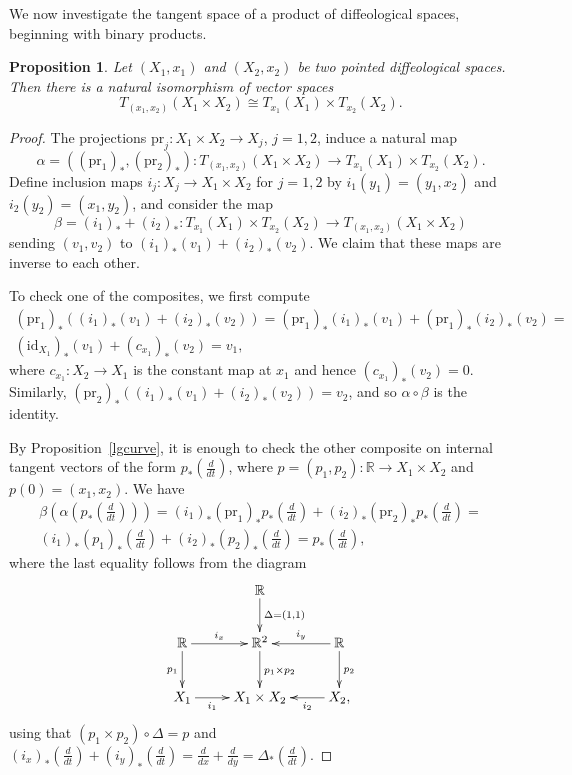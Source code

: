 \documentclass[12pt]{amsart}
\newtheorem{prop}[de]{Proposition}
\theoremstyle{remark}
\newcommand{\ra}{\to}
\newcommand{\ddt}{{\textstyle\frac{d}{dt}}}
\newcommand{\pr}{{\mathrm{pr}}}
\newcommand{\id}{{\mathrm{id}}}
\def \R{\mathbb{R}}
\begin{document}
We now investigate the tangent space of a product of diffeological spaces,
beginning with binary products.

\begin{prop}\label{product}
Let $(X_1,x_1)$ and $(X_2,x_2)$ be two pointed diffeological spaces.
Then there is a natural isomorphism of vector spaces
\[
T_{(x_1,x_2)}(X_1 \times X_2) \cong T_{x_1}(X_1) \times T_{x_2}(X_2).
\]
\end{prop}
\begin{proof}
The projections $\pr_j : X_1 \times X_2 \to X_j$, $j = 1, 2$, induce a natural map
\[ \alpha = ((\pr_1)_*, (\pr_2)_*) : T_{(x_1,x_2)}(X_1 \times X_2) \ra T_{x_1}(X_1) \times T_{x_2}(X_2). \]
Define inclusion maps $i_j : X_j \to X_1 \times X_2$ for $j = 1, 2$ by $i_1(y_1) = (y_1, x_2)$ and $i_2(y_2)=(x_1,y_2)$,
and consider the map
\[ \beta = (i_1)_* + (i_2)_* : T_{x_1}(X_1) \times T_{x_2}(X_2) \to T_{(x_1,x_2)}(X_1 \times X_2) \]
sending $(v_1, v_2)$ to $(i_1)_*(v_1) + (i_2)_*(v_2)$.
We claim that these maps are inverse to each other.

To check one of the composites, we first compute
\begin{multline*}
  (\pr_1)_*((i_1)_*(v_1) + (i_2)_*(v_2)) = (\pr_1)_* (i_1)_*(v_1) + (\pr_1)_* (i_2)_*(v_2)
= \\
(\id_{X_1})_* (v_1) + (c_{x_1})_* (v_2) = v_1,
\end{multline*}
where $c_{x_1} : X_2 \to X_1$ is the constant map at $x_1$ and hence $(c_{x_1})_* (v_2) = 0$.
Similarly, $(\pr_2)_*((i_1)_*(v_1) + (i_2)_*(v_2)) = v_2$, and so
$\alpha \circ \beta$ is the identity.

By Proposition~\ref{lgcurve}, it is enough to check the other composite
on internal tangent vectors of the form $p_*(\ddt)$, where $p = (p_1, p_2) : \R \to X_1 \times X_2$
and $p(0) = (x_1, x_2)$.
We have
\begin{multline*}
  \beta(\alpha(p_*(\ddt))) = (i_1)_* (\pr_1)_* p_*(\ddt) + (i_2)_* (\pr_2)_* p_* (\ddt)
= \\
(i_1)_* (p_1)_* (\ddt) + (i_2)_* (p_2)_* (\ddt) = p_*(\ddt),
\end{multline*}
where the last equality follows from the diagram
\[
  \xymatrix{
                                  & \R \ar[d]^-{\Delta = (1,1)}   & \\
    \R \ar[r]^-{i_x} \ar[d]_{p_1} & \R^2 \ar[d]^{p_1 \times p_2} & \R \ar[l]_-{i_y} \ar[d]^{p_2} \\
    X_1 \ar[r]_-{i_1}             & X_1 \times X_2               & X_2 , \ar[l]^-{i_2} \\
  }
\]
using that $(p_1 \times p_2) \circ \Delta = p$ and
$(i_x)_*(\ddt) + (i_y)_*(\ddt) = \frac{d}{dx} + \frac{d}{dy} = \Delta_*(\ddt)$.
\end{proof}
\end{document}
